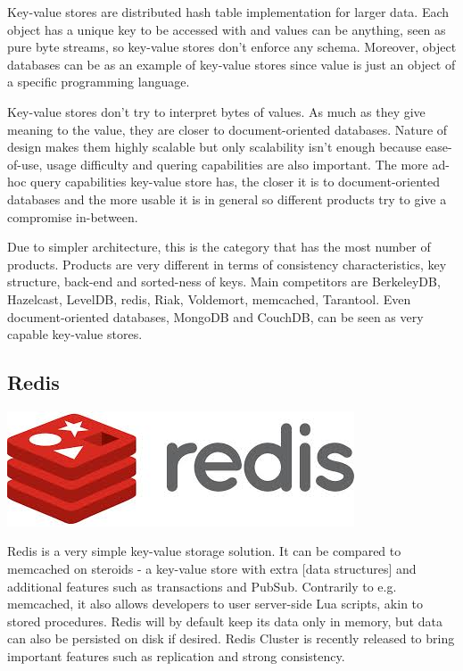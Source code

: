 Key-value stores are distributed hash table implementation for larger data.
Each object has a unique key to be accessed with and values can be anything, seen as pure byte streams, so key-value stores don't enforce any schema.
Moreover, object databases can be as an example of key-value stores since value is just an object of a specific programming language.

Key-value stores don't try to interpret bytes of values.
As much as they give meaning to the value, they are closer to document-oriented databases.
Nature of design makes them highly scalable but only scalability isn't enough because ease-of-use, usage difficulty and quering capabilities are also important.
The more ad-hoc query capabilities key-value store has, the closer it is to document-oriented databases and the more usable it is in general so different products try to give a compromise in-between.

Due to simpler architecture, this is the category that has the most number of products.
Products are very different in terms of consistency characteristics, key structure, back-end and sorted-ness of keys. Main competitors are BerkeleyDB, Hazelcast, LevelDB, redis, Riak, Voldemort, memcached, Tarantool. Even document-oriented databases, MongoDB and CouchDB, can be seen as very capable key-value stores.

\subsection{Redis}

\vspace{-1.15cm} \hspace{3cm} \includegraphics[scale=0.2]{3/figures/redis.jpg}

Redis is a very simple key-value storage solution. It can be compared to memcached on steroids - a key-value store with extra [data structures] and additional features such as transactions and PubSub. Contrarily to e.g. memcached, it also allows developers to user server-side Lua scripts, akin to stored procedures. Redis will by default keep its data only in memory, but data can also be persisted on disk if desired. Redis Cluster is recently released to bring important features such as replication and strong consistency.

